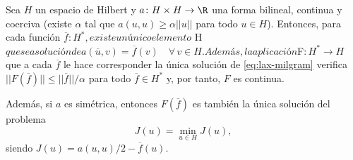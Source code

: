 \documentclass{article}
\begin{document}
\begin{theorem}
  \label{thm:lax-milgram}
  Sea $H$ un espacio de Hilbert y $a \colon H \times H \to \R$ una forma bilineal, continua y
  coerciva (existe $\alpha$ tal que $a(u,u) \ge \alpha ||u||$ para todo $u \in H$). Entonces, para
  cada función $\overline{f} \colon H^{*}, existe un único elemento $ \in
  H$ que sea solución de
  \begin{equation}
    \label{eq:lax-milgram}
    a(\overline{u}, v) = \overline{f}(v) \quad \forall \,v \in H.
    \tag{PD}
  \end{equation}
  Además, la aplicación $F$\colon H^* \to H$ que a cada $\overline{f}$ le hace corresponder la única
  solución de \eqref{eq:lax-milgram} verifica $||F(\overline{f})|| \le ||\overline{f}|| / \alpha$
  para todo $\overline{f} \in H^*$ y, por tanto, $F$ es continua.

  Además, si $a$ es simétrica, entonces $F(\overline{f})$ es también la única solución del problema
  \begin{equation}
    \label{eq:lax-milgram:pv}
    J(u) = \min_{u \in H} J(u),
    \tag{PV}
  \end{equation}
  siendo $J(u) = a(u,u)/2 - \overline{f}(u)$.
\end{theorem}
\end{document}
